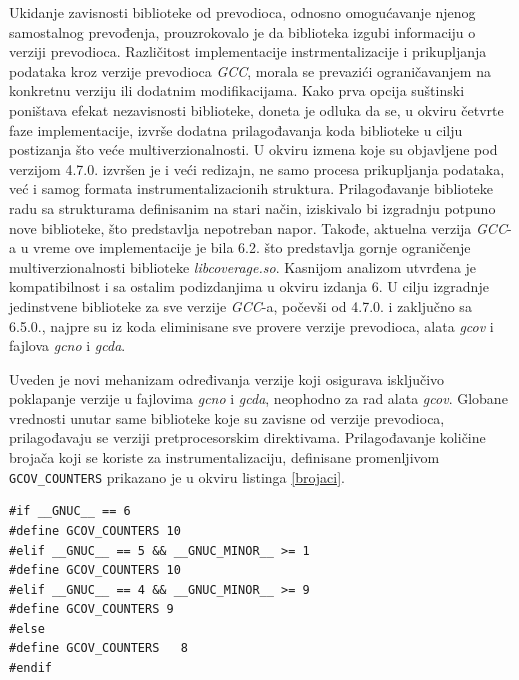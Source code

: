 \documentclass[12pt,oneside]{memoir}
\newcommand{\kod}[1]{\texttt{#1}}
\newcommand{\strano}[1]{\textit{#1}}
\begin{document}
Ukidanje zavisnosti biblioteke od prevodioca, odnosno omogućavanje njenog samostalnog prevođenja, prouzrokovalo je da biblioteka izgubi informaciju o verziji prevodioca. Različitost implementacije instrmentalizacije i prikupljanja podataka kroz verzije prevodioca \strano{GCC}, morala se prevazići ograničavanjem na konkretnu verziju ili dodatnim modifikacijama. Kako prva opcija suštinski poništava efekat nezavisnosti biblioteke, doneta je odluka da se, u okviru četvrte faze implementacije, izvrše dodatna prilagođavanja koda biblioteke u cilju postizanja što veće multiverzionalnosti. U okviru izmena koje su objavljene pod verzijom 4.7.0. izvršen je i veći redizajn, ne samo procesa prikupljanja podataka, već i samog formata instrumentalizacionih struktura. Prilagođavanje biblioteke radu sa strukturama definisanim na stari način, iziskivalo bi izgradnju potpuno nove biblioteke, što predstavlja nepotreban napor. Takođe, aktuelna verzija \strano{GCC}-a u vreme ove implementacije je bila 6.2. što predstavlja gornje ograničenje multiverzionalnosti biblioteke \strano{libcoverage.so}. Kasnijom analizom utvrđena je kompatibilnost i sa ostalim podizdanjima u okviru izdanja 6. U cilju izgradnje jedinstvene biblioteke za sve verzije \strano{GCC}-a, počevši od 4.7.0. i zaključno sa 6.5.0., najpre su iz koda eliminisane sve provere verzije prevodioca, alata \strano{gcov} i fajlova \strano{gcno} i \strano{gcda}. 

Uveden je novi mehanizam određivanja verzije koji osigurava isključivo poklapanje verzije u fajlovima \strano{gcno} i \strano{gcda}, neophodno za rad alata \strano{gcov}. 
Globane vrednosti unutar same biblioteke koje su zavisne od verzije prevodioca, prilagođavaju se verziji pretprocesorskim direktivama. Prilagođavanje količine brojača koji se koriste za instrumentalizaciju, definisane promenljivom \kod{GCOV\_COUNTERS} prikazano je u okviru listinga \ref{brojaci}.

\newpage

\begin{lstlisting}[caption={Definisanje količine brojača u zavisnosti od verzije prevodioca},frame=single, label=brojaci]
#if __GNUC__ == 6
#define GCOV_COUNTERS 10
#elif __GNUC__ == 5 && __GNUC_MINOR__ >= 1
#define GCOV_COUNTERS 10
#elif __GNUC__ == 4 && __GNUC_MINOR__ >= 9
#define GCOV_COUNTERS 9
#else
#define GCOV_COUNTERS   8
#endif
\end{lstlisting}
\end{document}

